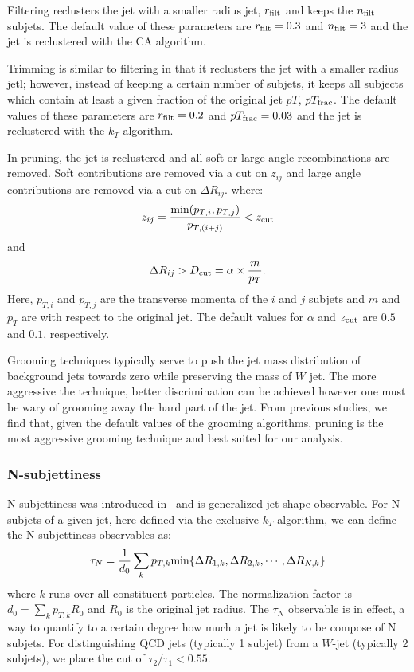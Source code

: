 Filtering reclusters the jet with a smaller radius jet, $r_{\rm filt}$ and keeps the $n_{\rm filt}$ subjets.
The default value of these parameters are $r_{\rm filt} = 0.3$ and $n_{\rm filt} = 3$ and the jet is reclustered with the CA algorithm.

Trimming is similar to filtering in that it reclusters the jet with a smaller radius jetl; however, instead of keeping 
a certain number of subjets, it keeps all subjects which contain at least a given fraction of the original jet $pT$, $pT_{\rm frac}$. 
The default values of these parameters are $r_{\rm filt} = 0.2$ and $pT_{\rm frac} = 0.03$ and the jet is reclustered with the $k_T$ algorithm.

In pruning, the jet is reclustered and all soft or large angle recombinations are removed.  Soft contributions are removed via a cut on $z_{ij}$
and large angle contributions are removed via a cut on $\Delta R_{ij}$.
where:
\begin{equation}
z_{ij} = \frac{{\rm min}(p_{T,i},p_{T,j})}{p_{T,(i+j)}} < z_{\rm cut}
\end{equation}
and 
\begin{equation}
\Delta R_{ij} > D_{\rm cut} = \alpha \times \frac{m}{p_T}.
\end{equation}
Here, $p_{T,i}$ and $p_{T,j}$ are the transverse momenta of the $i$ and $j$ subjets and $m$ and $p_T$ are with respect to the original jet.  
The default values for $\alpha$ and $z_{\rm cut}$ are $0.5$ and $0.1$, respectively.

Grooming techniques typically serve to push the jet mass distribution of background jets towards zero while preserving the mass of $W$ jet.  
The more aggressive the technique, better discrimination can be achieved however one must be wary of grooming away the hard part of the jet.  
From previous studies, we find that, given the default values of the grooming algorithms, pruning is the most aggressive grooming technique and 
best suited for our analysis.


\subsubsection{N-subjettiness}

N-subjettiness was introduced in~\cite{Thaler:2010tr} and is generalized jet shape observable. 
For N subjets of a given jet, here defined via the exclusive $k_T$ algorithm, we can define the 
N-subjettiness observables as:
\begin{equation}
\tau_N = \frac{1}{d_0} \sum_k p_{T,k} {\rm min} \{ \Delta R_{1,k},\Delta R_{2,k},\cdots, \Delta R_{N,k} \}
\end{equation} 
where $k$ runs over all constituent particles.
The normalization factor is $d_0 = \sum_k p_{T,k}R_0$ and $R_0$ is the original jet radius.  
The $\tau_N$ observable is in effect, a way to quantify to a certain degree how much a jet is likely to be compose of N subjets.  
For distinguishing QCD jets (typically 1 subjet) from a $W$-jet (typically 2 subjets), we place the cut of $\tau_2/\tau_1<0.55$.


